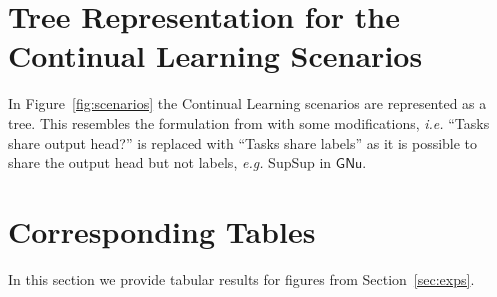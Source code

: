 \documentclass{article}
\newcommand{\ac}{SupSup\xspace}
\newcommand{\casename}[1]{\ensuremath{\mathsf{#1}}\xspace}
\begin{document}
\section{Tree Representation for the Continual Learning Scenarios}
In Figure~\ref{fig:scenarios} the Continual Learning scenarios are represented as a tree. This resembles the formulation from \cite{zeno2018task} with some modifications, \textit{i.e.} ``Tasks share output head?'' is replaced with ``Tasks share labels'' as it is possible to share the output head but not labels, \textit{e.g.} \ac in \casename{GNu}.

\section{Corresponding Tables}\label{sec:tables}
In this section we provide tabular results for figures from Section~\ref{sec:exps}.
\begin{table}[H]
    \centering
    \caption{Accuracy on SplitCIFAR100 corresponding to \autoref{fig:t1} \textbf{(right)}. \ac with Transfer approaches the upper bound.}
    
    \label{tab:t1}
\end{table}

\begin{table}[H]
    \centering
    \caption{Accuracy on  PermutedMNIST with LeNet 300-100 corresponding to \autoref{fig:v1-v2} \textbf{(left)}.}
    
    \label{tab:v1-v2-left}
\end{table}
\begin{table}[H]
    \centering
        \caption{Accuracy on PermutedMNIST with FC 1024-1024 corresponding to \autoref{fig:v1-v2} \textbf{(right)}.}
    
    \label{tab:v1-v2-right}
\end{table}
\begin{table}[H]
    \centering
    \caption{Accuracy on PermutedMNIST with LeNet 300-100 corresponding to \autoref{fig:long-zoom}.}
    
    \label{tab:long}
\end{table}
\begin{table}[H]
    \centering
    \caption{Accuracy with FC 1024-1024 on RotatedMNIST corresponding to \autoref{fig:rot-adapt} \textbf{(left)}.}
    
    \label{tab:rot-adapt-left}
\end{table}
\begin{table}[H]
    \centering
    \caption{Accuracy with FC 1024-1024 on PermutedMNIST corresponding to \autoref{fig:rot-adapt} \textbf{(right)}.}
    
    \label{tab:rot-adapt-right}
\end{table}
\begin{table}[H]
    \centering
    \caption{Accuracy on PermutedMNIST with LeNet 300-100 corresponding to \autoref{fig:v1-v2-sz} \textbf{(left)}.}
    
    \label{tab:v1-v2-sz-left}
\end{table}
\begin{table}[H]
    \centering
    \caption{Accuracy on PermutedMNIST with FC 1024-1024 corresponding to \autoref{fig:v1-v2-sz} \textbf{(right)}.}
    
    \label{tab:v1-v2-sz-right}
\end{table}
\end{document}
